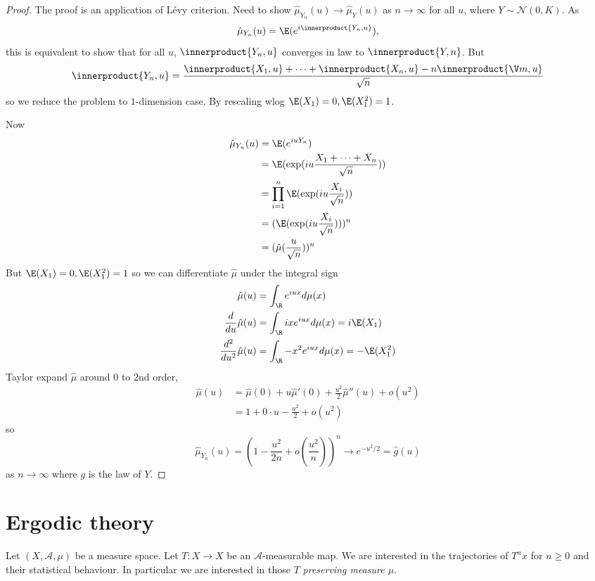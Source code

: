 \documentclass[a4paper]{article}
\newcommand*{\ip}{\innerproduct} %
\begin{document}

\begin{proof}
  The proof is an application of Lévy criterion. Need to show \(\hat \mu_{Y_n}(u) \to \hat \mu_Y(u)\) as \(n \to \infty\) for all \(u\), where \(Y \sim \mathcal N(0, K)\). As
  \[
    \hat \mu_{Y_n}(u) = \E( e^{i \ip{Y_n, u}}),
  \]
  this is equivalent to show that for all \(u\), \(\ip{Y_n, u}\) converges in law to \(\ip{Y, n}\). But
  \[
    \ip{Y_n, u} = \frac{\ip{X_1, u} + \dots + \ip{X_n, u} - n \ip{\V m, u}}{\sqrt n}
  \]
  so we reduce the problem to \(1\)-dimension case. By rescaling wlog \(\E(X_1) = 0, \E(X_1^2) = 1\).

  Now
  \begin{align*}
    \hat \mu_{Y_n}(u)
    &= \E(e^{iuY_n}) \\
    &= \E(\exp (iu \frac{X_1 + \dots + X_n}{\sqrt n})) \\
    &= \prod_{i = 1}^n \E(\exp (iu \frac{X_i}{\sqrt n})) \\
    &= (\E(\exp (iu \frac{X_i}{\sqrt n})))^n \\
    &= (\hat \mu (\frac{u}{\sqrt n}))^n
  \end{align*}
  But \(\E(X_1) = 0, \E(X_1^2) = 1\) so we can differentiate \(\hat \mu\) under the integral sign
  \begin{align*}
    \hat \mu(u) &= \int_\R e^{iux} d \mu(x) \\
    \frac{d}{du} \hat \mu(u) &= \int_\R ix e^{iux} d\mu(x) = i \E(X_1) \\
    \frac{d^2}{du^2} \hat \mu(u) &= \int_\R -x^2 e^{iux} d\mu(x) = -\E(X_1^2)
  \end{align*}
  Taylor expand \(\hat \mu\) around \(0\) to \(2\)nd order,
  \begin{align*}
    \hat \mu (u)
    &= \hat \mu(0) + u \hat \mu'(0) + \frac{u^2}{2} \hat \mu''(u) + o(u^2) \\
    &= 1 + 0 \cdot u - \frac{u^2}{2} + o(u^2)
  \end{align*}
  so
  \[
    \hat \mu_{Y_n}(u)
    = (1 - \frac{u^2}{2n} + o(\frac{u^2}{n}))^n
    \to e^{-u^2/2}
    = \hat g(u)
  \]
  as \(n \to \infty\) where \(g\) is the law of \(Y\).
\end{proof}

\section{Ergodic theory}

Let \((X, \mathcal A, \mu)\) be a measure space. Let \(T: X \to X\) be an \(\mathcal A\)-measurable map. We are interested in the trajectories of \(T^n x\) for \(n \geq 0\) and their statistical behaviour. In particular we are interested in those \(T\) \emph{preserving measure \(\mu\)}.
\end{document}
